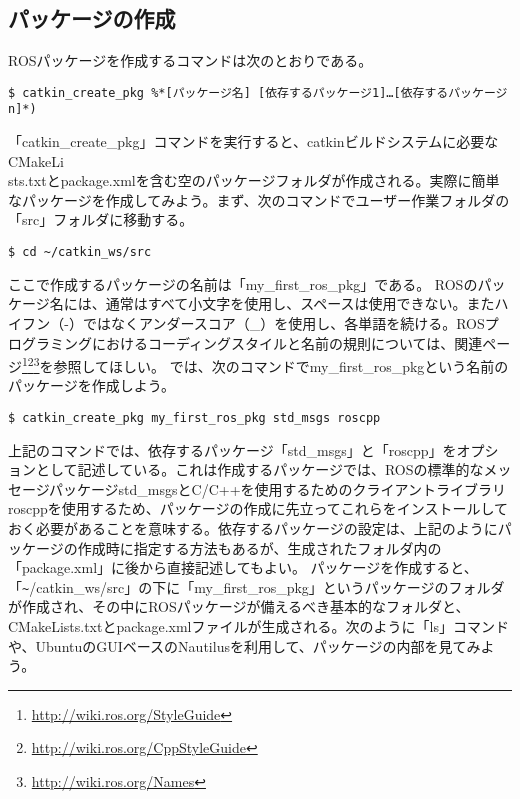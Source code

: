 \subsection{パッケージの作成}

ROSパッケージを作成するコマンドは次のとおりである。

\begin{lstlisting}[language=ROS]
$ catkin_create_pkg %*[パッケージ名] [依存するパッケージ1]…[依存するパッケージn]*)
\end{lstlisting}

「catkin\_create\_pkg」コマンドを実行すると、catkinビルドシステムに必要なCMakeLi\\sts.txtとpackage.xmlを含む空のパッケージフォルダが作成される。実際に簡単なパッケージを作成してみよう。まず、次のコマンドでユーザー作業フォルダの「src」フォルダに移動する。

\begin{lstlisting}[language=ROS]
$ cd ~/catkin_ws/src
\end{lstlisting}

ここで作成するパッケージの名前は「my\_first\_ros\_pkg」である。 ROSのパッケージ名には、通常はすべて小文字を使用し、スペースは使用できない。またハイフン（-）ではなくアンダースコア（\_）を使用し、各単語を続ける。ROSプログラミングにおけるコーディングスタイルと名前の規則については、関連ページ\footnote{\url{http://wiki.ros.org/StyleGuide}}\footnote{\url{http://wiki.ros.org/CppStyleGuide}}\footnote{\url{http://wiki.ros.org/Names}}を参照してほしい。
では、次のコマンドでmy\_first\_ros\_pkgという名前のパッケージを作成しよう。

\begin{lstlisting}[language=ROS]
$ catkin_create_pkg my_first_ros_pkg std_msgs roscpp
\end{lstlisting}

上記のコマンドでは、依存するパッケージ「std\_msgs」と「roscpp」をオプションとして記述している。これは作成するパッケージでは、ROSの標準的なメッセージパッケージstd\_msgsとC/C++を使用するためのクライアントライブラリroscppを使用するため、パッケージの作成に先立ってこれらをインストールしておく必要があることを意味する。依存するパッケージの設定は、上記のようにパッケージの作成時に指定する方法もあるが、生成されたフォルダ内の「package.xml」に後から直接記述してもよい。
パッケージを作成すると、「\verb|~|/catkin\_ws/src」の下に「my\_first\_ros\_pkg」というパッケージのフォルダが作成され、その中にROSパッケージが備えるべき基本的なフォルダと、CMakeLists.txtとpackage.xmlファイルが生成される。次のように「ls」コマンドや、UbuntuのGUIベースのNautilusを利用して、パッケージの内部を見てみよう。

